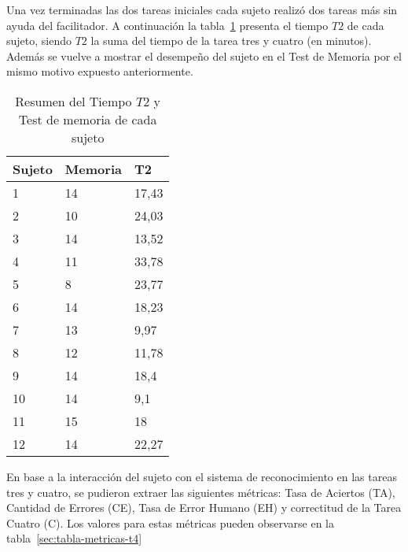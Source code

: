 Una vez terminadas las dos tareas iniciales cada sujeto realiz\'o dos tareas m\'as sin ayuda del facilitador. A
continuaci\'on la tabla~\ref{sec:tabla-t2-memoria} presenta el tiempo $T2$ de cada sujeto, siendo $T2$ 
la suma del tiempo de la tarea tres y cuatro (en minutos). Adem\'as se vuelve a mostrar el desempeño del sujeto
en el Test de Memoria por el mismo motivo expuesto anteriormente.

\begin{table}[H]
\centering
\footnotesize
\begin{tabular}{|p{1.6cm}|p{1.6cm}|p{1.6cm}|}
\hline
    Sujeto & Memoria & T2 \\
    \hline 
    1 & 14 &  17,43 \\
    2 & 10 &  24,03  \\
    3 & 14 &  13,52 \\
    4 & 11 &  33,78 \\
    5 & 8 &   23,77 \\
    6 & 14 &  18,23 \\
    7 & 13 &  9,97 \\
    8 & 12 &  11,78 \\
    9 & 14 &  18,4    \\
    10 & 14 & 9,1 \\
    11 & 15 & 18  \\
    12 & 14 & 22,27 \\
\hline
\end{tabular}
\caption{Resumen del Tiempo $T2$ y Test de memoria de cada sujeto}
\label{sec:tabla-t2-memoria}
\end{table}

En base a la interacci\'on del sujeto con el sistema de reconocimiento en las tareas tres y cuatro, se pudieron
extraer las siguientes m\'etricas: Tasa de Aciertos (TA), Cantidad de Errores (CE), Tasa de Error Humano (EH) y
correctitud de la Tarea Cuatro (C). Los valores para estas m\'etricas pueden observarse en la tabla~\ref{sec:tabla-metricas-t4}

